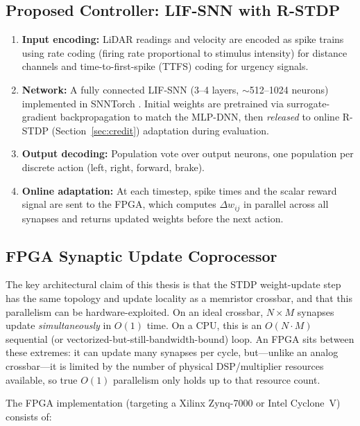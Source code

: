 \documentclass[11pt,a4paper]{article}
\begin{document}
\subsection{Proposed Controller: LIF-SNN with R-STDP}

\begin{enumerate}[leftmargin=*, itemsep=3pt]
  \item \textbf{Input encoding:} LiDAR readings and velocity are encoded as spike trains
        using rate coding (firing rate proportional to stimulus intensity) for distance
        channels and time-to-first-spike (TTFS) coding for urgency signals.
  \item \textbf{Network:} A fully connected LIF-SNN (3--4 layers, $\sim$512--1024
        neurons) implemented in SNNTorch \cite{eshraghian2023}. Initial weights are
        pretrained via surrogate-gradient backpropagation to match the MLP-DNN, then
        \emph{released} to online R-STDP (Section~\ref{sec:credit}) adaptation during
        evaluation.
  \item \textbf{Output decoding:} Population vote over output neurons, one population
        per discrete action (left, right, forward, brake).
  \item \textbf{Online adaptation:} At each timestep, spike times and the scalar reward
        signal are sent to the FPGA, which computes $\Delta w_{ij}$ in parallel across
        all synapses and returns updated weights before the next action.
\end{enumerate}

\subsection{FPGA Synaptic Update Coprocessor}

The key architectural claim of this thesis is that the STDP weight-update step has the
same topology and update locality as a memristor crossbar, and that this parallelism
can be hardware-exploited. On an ideal crossbar, $N \times M$ synapses update
\emph{simultaneously} in $O(1)$ time. On a CPU, this is an $O(N \cdot M)$ sequential
(or vectorized-but-still-bandwidth-bound) loop. An FPGA sits between these extremes:
it can update many synapses per cycle, but---unlike an analog crossbar---it is limited
by the number of physical DSP/multiplier resources available, so true $O(1)$
parallelism only holds up to that resource count.

The FPGA implementation (targeting a Xilinx Zynq-7000 or Intel Cyclone~V) consists of:
\end{document}
